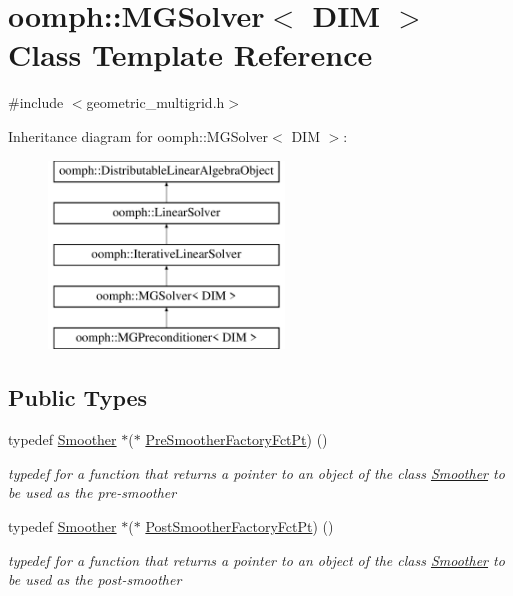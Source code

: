 \hypertarget{classoomph_1_1MGSolver}{}\section{oomph\+:\+:M\+G\+Solver$<$ D\+IM $>$ Class Template Reference}
\label{classoomph_1_1MGSolver}


{\ttfamily \#include $<$geometric\+\_\+multigrid.\+h$>$}

Inheritance diagram for oomph\+:\+:M\+G\+Solver$<$ D\+IM $>$\+:\begin{figure}[H]
\begin{center}
\leavevmode
\includegraphics[height=5.000000cm]{classoomph_1_1MGSolver}
\end{center}
\end{figure}
\subsection*{Public Types}
\begin{DoxyCompactItemize}
\item 
typedef \hyperlink{classoomph_1_1Smoother}{Smoother} $\ast$($\ast$ \hyperlink{classoomph_1_1MGSolver_a43de5ad4985ae1bbe68388619a9db32a}{Pre\+Smoother\+Factory\+Fct\+Pt}) ()
\begin{DoxyCompactList}\small\item\em typedef for a function that returns a pointer to an object of the class \hyperlink{classoomph_1_1Smoother}{Smoother} to be used as the pre-\/smoother \end{DoxyCompactList}\item 
typedef \hyperlink{classoomph_1_1Smoother}{Smoother} $\ast$($\ast$ \hyperlink{classoomph_1_1MGSolver_a72fa4eb80c0b5a0ec6811dcd92b30231}{Post\+Smoother\+Factory\+Fct\+Pt}) ()
\begin{DoxyCompactList}\small\item\em typedef for a function that returns a pointer to an object of the class \hyperlink{classoomph_1_1Smoother}{Smoother} to be used as the post-\/smoother \end{DoxyCompactList}\end{DoxyCompactItemize}
